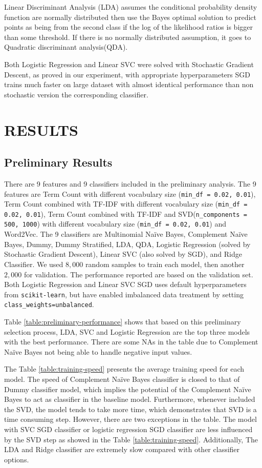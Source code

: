 \documentclass[compsoc]{IEEEtran}
\begin{document}
Linear Discriminant Analysis (LDA) assumes the conditional probability density function are normally distributed then use the Bayes optimal solution to predict points as being from the second class if the log of the likelihood ratios is bigger than some threshold. If there is no normally distributed assumption, it goes to Quadratic discriminant analysis(QDA).

Both Logistic Regression and Linear SVC were solved with Stochastic Gradient Descent, as proved in our experiment, with appropriate hyperparameters SGD trains much faster on large dataset with almost identical performance than non stochastic version the corresponding classifier.


\section{RESULTS}

\subsection{Preliminary Results}

There are 9 features and 9 classifiers included in the preliminary analysis. The 9 features are Term Count with different vocabulary size (\texttt{min\_df = 0.02, 0.01}), Term Count combined with TF-IDF with different vocabulary size (\texttt{min\_df = 0.02, 0.01}), Term Count combined with TF-IDF and SVD(\texttt{n\_components = 500, 1000}) with different vocabulary size (\texttt{min\_df = 0.02, 0.01}) and Word2Vec. The 9 classifiers are Multinomial Na\"ive Bayes, Complement Na\"ive Bayes, Dummy, Dummy Stratified, LDA, QDA, Logistic Regression (solved by Stochastic Gradient Descent), Linear SVC (also solved by SGD), and Ridge Classifier. We used $8,000$ random samples to train each model, then another $2,000$ for validation. The performance reported are based on the validation set. Both Logistic Regression and Linear SVC SGD uses default hyperparameters from \texttt{scikit-learn}, but have enabled imbalanced data treatment by setting \texttt{class\_weights=unbalanced}.

Table \ref{table:preliminary-performance} shows that based on this preliminary selection process, LDA, SVC and Logistic Regression are the top three models with the best performance. There are some NAs in the table due to Complement Na\"ive Bayes not being able to handle negative input values.

The Table \ref{table:training-speed} presents the average training speed for each model. The speed of Complement Na\"ive Bayes classifier is closed to that of Dummy classifier model, which implies the potential of the Complement Na\"ive Bayes to act as classifier in the baseline model. Furthermore, whenever included the SVD, the model tends to take more time, which demonstrates that SVD is a time consuming step. However, there are two exceptions in the table. The model with SVC SGD classifier or logistic regression SGD classifier are less influenced by the SVD step as showed in the Table \ref{table:training-speed}. Additionally, The LDA and Ridge classifier are extremely slow compared with other classifier options.
\end{document}
